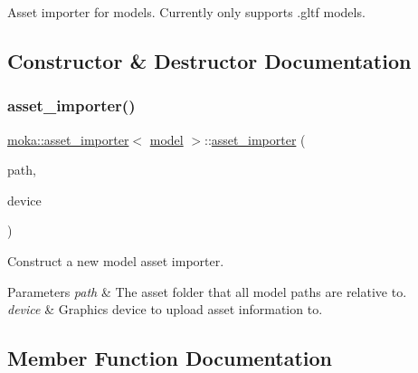 Asset importer for models. Currently only supports .gltf models. 

\subsection{Constructor \& Destructor Documentation}
\mbox{\label{classmoka_1_1asset__importer_3_01model_01_4_ac82a2e9a4daea64ba18411e7ed43c1a4}} 
\subsubsection{\texorpdfstring{asset\_importer()}{asset\_importer()}}
{\footnotesize\ttfamily \mbox{\hyperlink{classmoka_1_1asset__importer}{moka\+::asset\+\_\+importer}}$<$ \mbox{\hyperlink{classmoka_1_1model}{model}} $>$\+::\mbox{\hyperlink{classmoka_1_1asset__importer}{asset\+\_\+importer}} (\begin{DoxyParamCaption}\item[{const std\+::filesystem\+::path \&}]{path,  }\item[{\mbox{\hyperlink{classmoka_1_1graphics__device}{graphics\+\_\+device}} \&}]{device }\end{DoxyParamCaption})}



Construct a new model asset importer. 


\begin{DoxyParams}{Parameters}
{\em path} & The asset folder that all model paths are relative to. \\
\hline
{\em device} & Graphics device to upload asset information to. \\
\hline
\end{DoxyParams}


\subsection{Member Function Documentation}
\mbox{\label{classmoka_1_1asset__importer_3_01model_01_4_a6995490f470bc1482db156bc1b8d75fb}} 
